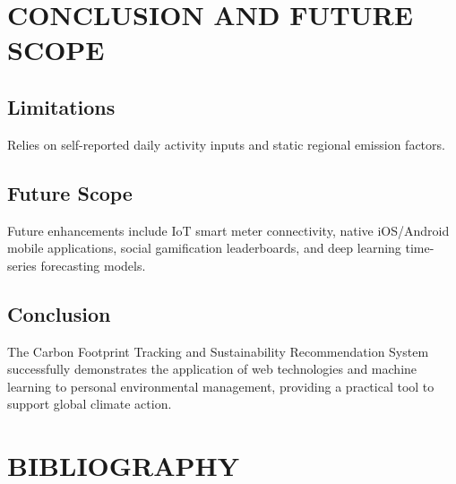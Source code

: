 \documentclass[12pt,a4paper]{report}
\begin{document}
\chapter{CONCLUSION AND FUTURE SCOPE}

\section{Limitations}
Relies on self-reported daily activity inputs and static regional emission factors.

\section{Future Scope}
Future enhancements include IoT smart meter connectivity, native iOS/Android mobile applications, social gamification leaderboards, and deep learning time-series forecasting models.

\section{Conclusion}
The Carbon Footprint Tracking and Sustainability Recommendation System successfully demonstrates the application of web technologies and machine learning to personal environmental management, providing a practical tool to support global climate action.

\chapter{BIBLIOGRAPHY}
\end{document}
